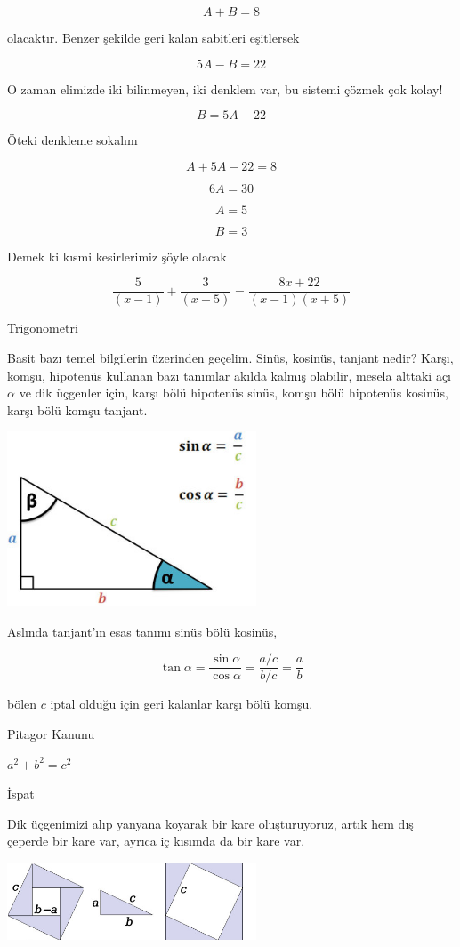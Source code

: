 \documentclass[12pt,fleqn]{article}\usepackage{../../common}
\begin{document}
$$ A + B = 8 $$

olacaktır. Benzer şekilde geri kalan sabitleri eşitlersek 

$$ 5A - B = 22 $$

O zaman elimizde iki bilinmeyen, iki denklem var, bu sistemi çözmek çok
kolay! 

$$ B = 5A - 22 $$

Öteki denkleme sokalım

$$ A + 5A - 22 = 8 $$

$$ 6A = 30 $$

$$ A = 5 $$

$$ B = 3 $$

Demek ki kısmi kesirlerimiz şöyle olacak 

$$ \frac{5}{(x-1)} + \frac{3}{(x+5)} = \frac{8x + 22}{(x-1)(x+5)}$$

\newpage

Trigonometri

Basit bazı temel bilgilerin üzerinden geçelim. Sinüs, kosinüs, tanjant nedir?
Karşı, komşu, hipotenüs kullanan bazı tanımlar akılda kalmış olabilir, mesela
alttaki açı $\alpha$ ve dik üçgenler için, karşı bölü hipotenüs sinüs, komşu
bölü hipotenüs kosinüs, karşı bölü komşu tanjant.

\includegraphics[width=20em]{trig-reciprocal2.jpg}

Aslında tanjant'ın esas tanımı sinüs bölü kosinüs,

$$
\tan \alpha = \frac{\sin\alpha}{\cos\alpha} = \frac{a / c}{b / c} = \frac{a}{b}
$$

bölen $c$ iptal olduğu için geri kalanlar karşı bölü komşu. 

Pitagor Kanunu

$a^2 + b^2 = c^2$

İspat

Dik üçgenimizi alıp yanyana koyarak bir kare oluşturuyoruz, artık hem dış
çeperde bir kare var, ayrıca iç kısımda da bir kare var. 

\includegraphics[width=20em]{Pythagoras.png}
\end{document}
